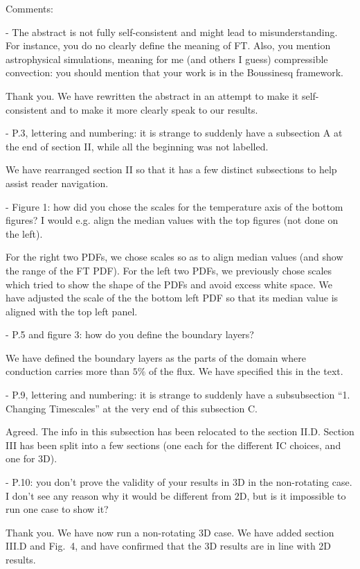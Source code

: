 \documentclass[aps, 11pt, singlecolumn]{revtex4-1} %
\begin{document}
\begin{singlespace}
\begin{myquotation}
Comments:

-       The abstract is not fully self-consistent and might lead to misunderstanding.
For instance, you do no clearly define the meaning of FT. 
Also, you mention astrophysical simulations, meaning for me (and others I guess) compressible convection: you should mention that your work is in the Boussinesq framework.
\end{myquotation}
Thank you.
We have rewritten the abstract in an attempt to make it self-consistent and to make it more clearly speak to our results.
\begin{myquotation}
-       P.3, lettering and numbering: it is strange to suddenly have a subsection A at the end of section II, while all the beginning was not labelled.
\end{myquotation}
We have rearranged section II so that it has a few distinct subsections to help assist reader navigation.
\begin{myquotation}
-       Figure 1: how did you chose the scales for the temperature axis of the bottom figures? 
I would e.g. align the median values with the top figures (not done on the left).
\end{myquotation}
For the right two PDFs, we chose scales so as to align median values (and show the range of the FT PDF).
For the left two PDFs, we previously chose scales which tried to show the shape of the PDFs and avoid excess white space.
We have adjusted the scale of the the bottom left PDF so that its median value is aligned with the top left panel.
\begin{myquotation}
-       P.5 and figure 3: how do you define the boundary layers?
\end{myquotation}
We have defined the boundary layers as the parts of the domain where conduction carries more than $5\%$ of the flux.
We have specified this in the text.
\begin{myquotation}
-       P.9, lettering and numbering: it is strange to suddenly have a subsubsection “1. Changing Timescales” at the very end of this subsection C.
\end{myquotation}
Agreed.
The info in this subsection has been relocated to the section II.D.
Section III has been split into a few sections (one each for the different IC choices, and one for 3D).

\begin{myquotation}
-       P.10: you don’t prove the validity of your results in 3D in the non-rotating case. 
I don’t see any reason why it would be different from 2D, but is it impossible to run one case to show it?
\end{myquotation}
Thank you.
We have now run a non-rotating 3D case.
We have added section III.D and Fig.~4, and have confirmed that the 3D results are in line with 2D results.


\end{singlespace}
\end{document}

